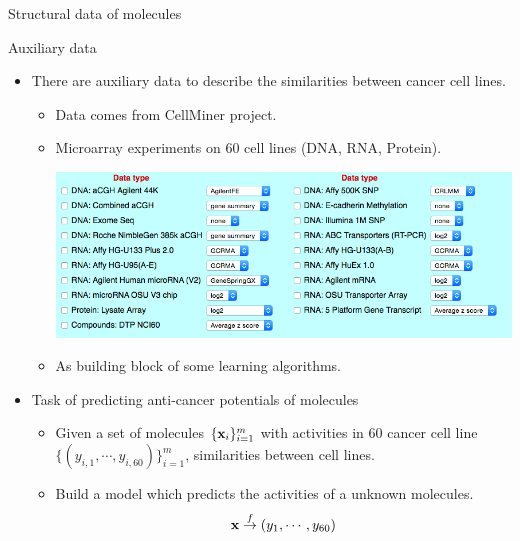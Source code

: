 \documentclass[first=dgreen,second=purple,logo=yellowexc]{aaltoslides}
\begin{document}
{\begin{frame}{Structural data of molecules}
\begin{itemize}
	\end{itemize}
\end{frame}

\begin{frame}{Auxiliary data}
	\begin{itemize}
		\item There are auxiliary data to describe the similarities between cancer cell lines.
		\begin{itemize}
			\footnotesize
			\item Data comes from CellMiner project.
			\item Microarray experiments on $60$ cell lines (DNA, RNA, Protein).
			\begin{center}
				\includegraphics[scale=0.3]{./figures/auxiliarydata.png}
			\end{center}
			\item As building block of some learning algorithms. 
		\end{itemize}
		\item Task of predicting anti-cancer potentials of molecules
		\begin{itemize}
			\footnotesize
			\item Given a set of molecules $\{\mathbf {x}_i\}_{i=1}^m$ with activities in $60$ cancer cell line $\{(y_{i,1},\cdots,y_{i,60})\}_{i=1}^m$, similarities between cell lines.
			\item Build a model which predicts the activities of a unknown molecules.
			\begin{align*}
				\mathbf {x} \overset{f}{\rightarrow} (y_{1},\cdots,y_{60})
			\end{align*}
		\end{itemize}
	\end{itemize}
\end{frame}


}
\end{document}
